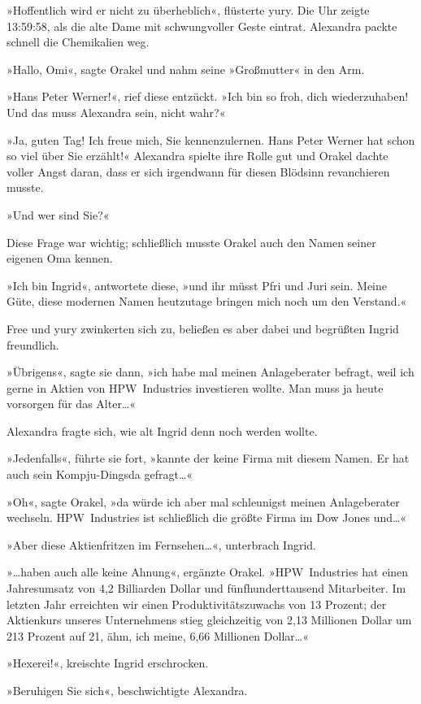 »Hoffentlich wird er nicht zu überheblich«, flüsterte yury. Die Uhr zeigte 13:59:58, als die alte Dame mit schwungvoller Geste eintrat. Alexandra packte schnell die Chemikalien weg.

»Hallo, Omi«, sagte Orakel und nahm seine »Großmutter« in den Arm.

»Hans Peter Werner!«, rief diese entzückt. »Ich bin so froh, dich wiederzuhaben! Und das muss Alexandra sein, nicht wahr?«

»Ja, guten Tag! Ich freue mich, Sie kennenzulernen. Hans Peter Werner hat schon so viel über Sie erzählt!« Alexandra spielte ihre Rolle gut und Orakel dachte voller Angst daran, dass er sich irgendwann für diesen Blödsinn revanchieren musste.

»Und wer sind Sie?«

Diese Frage war wichtig; schließlich musste Orakel auch den Namen seiner eigenen Oma kennen.

»Ich bin Ingrid«, antwortete diese, »und ihr müsst Pfri und Juri sein. Meine Güte, diese modernen Namen heutzutage bringen mich noch um den Verstand.«

Free und yury zwinkerten sich zu, beließen es aber dabei und begrüßten Ingrid freundlich.

»Übrigens«, sagte sie dann, »ich habe mal meinen Anlageberater befragt, weil ich gerne in Aktien von HPW~Industries investieren wollte. Man muss ja heute vorsorgen für das Alter…«

Alexandra fragte sich, wie alt Ingrid denn noch werden wollte.

»Jedenfalls«, führte sie fort, »kannte der keine Firma mit diesem Namen. Er hat auch sein Kompju-Dingsda gefragt…«

»Oh«, sagte Orakel, »da würde ich aber mal schleunigst meinen Anlageberater wechseln. HPW~Industries ist schließlich die größte Firma im Dow Jones und…«

»Aber diese Aktienfritzen im Fernsehen…«, unterbrach Ingrid.

»…haben auch alle keine Ahnung«, ergänzte Orakel. »HPW~Industries hat einen Jahresumsatz von 4,2 Billiarden Dollar und fünfhunderttausend Mitarbeiter. Im letzten Jahr erreichten wir einen Produktivitätszuwachs von 13 Prozent; der Aktienkurs unseres Unternehmens stieg gleichzeitig von 2,13 Millionen Dollar um 213 Prozent auf 21, ähm, ich meine, 6,66 Millionen Dollar…«

»Hexerei!«, kreischte Ingrid erschrocken.

»Beruhigen Sie sich«, beschwichtigte Alexandra.

